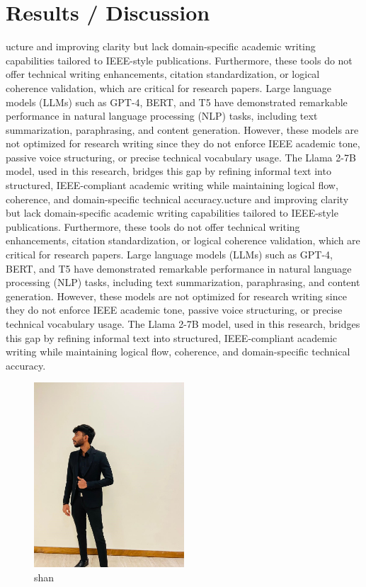 \documentclass[conference]{IEEEtran}
\begin{document}
  \section{Results / Discussion}
  ucture and improving clarity but lack domain-specific academic writing capabilities tailored to IEEE-style publications. Furthermore, these tools do not offer technical writing enhancements, citation standardization, or logical coherence validation, which are critical for research papers.
Large language models (LLMs) such as GPT-4, BERT, and T5 have demonstrated remarkable performance in natural language processing (NLP) tasks, including text summarization, paraphrasing, and content generation. However, these models are not optimized for research writing since they do not enforce IEEE academic tone, passive voice structuring, or precise technical vocabulary usage. The Llama 2-7B model, used in this research, bridges this gap by refining informal text into structured, IEEE-compliant academic writing while maintaining logical flow, coherence, and domain-specific technical accuracy.ucture and improving clarity but lack domain-specific academic writing capabilities tailored to IEEE-style publications. Furthermore, these tools do not offer technical writing enhancements, citation standardization, or logical coherence validation, which are critical for research papers.
Large language models (LLMs) such as GPT-4, BERT, and T5 have demonstrated remarkable performance in natural language processing (NLP) tasks, including text summarization, paraphrasing, and content generation. However, these models are not optimized for research writing since they do not enforce IEEE academic tone, passive voice structuring, or precise technical vocabulary usage. The Llama 2-7B model, used in this research, bridges this gap by refining informal text into structured, IEEE-compliant academic writing while maintaining logical flow, coherence, and domain-specific technical accuracy.

\begin{figure}[h]
\centering
\includegraphics[width=0.5\textwidth]{..//uploads/1740312155867.jpg}
\caption{shan}
\end{figure}
\end{document}
